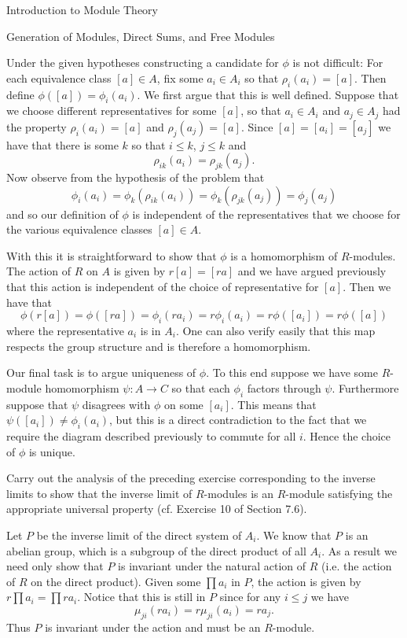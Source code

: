 \begin{chapter}{Introduction to Module Theory}
\begin{section}{Generation of Modules, Direct Sums, and Free Modules}
\begin{solution}
Under the given hypotheses constructing a candidate for $\phi$ is not difficult: For each equivalence class $[a]\in A$, fix some $a_i \in A_i$ so that $\rho_i(a_i) = [a]$. Then define $\phi([a]) = \phi_i(a_i)$. We first argue that this is well defined. Suppose that we choose different representatives for some $[a]$, so that $a_i\in A_i$ and $a_j\in A_j$ had the property $\rho_i(a_i) = [a]$ and $\rho_j(a_j) = [a]$. Since $[a] = [a_i] = [a_j]$ we have that there is some $k$ so that $i\le k$, $j\le k$  and \[
\rho_{ik}(a_i) = \rho_{jk}(a_j).
\]
Now observe from the hypothesis of the problem that \[
\phi_i(a_i) =  \phi_k(\rho_{ik}(a_i)) = \phi_k(\rho_{jk}(a_j))  = \phi_j(a_j)
\]
and so our definition of $\phi$ is independent of the representatives that we choose for the various equivalence classes $[a]\in A$.

With this it is straightforward to show that $\phi$ is a homomorphism of $R$-modules. The action of $R$ on $A$ is given by $r[a] = [ra]$ and we have argued previously that this action is independent of the choice of representative for $[a]$. Then we have that \[
\phi(r[a]) = \phi([ra]) = \phi_i(ra_i) = r\phi_i(a_i) = r\phi([a_i]) = r\phi([a])
\]
where the representative $a_i$ is in $A_i$. One can also verify easily that this map respects the group structure and is therefore a homomorphism. 

Our final task is to argue uniqueness of $\phi$. To this end suppose we have some $R$-module homomorphism $\psi: A\to C$ so that each $\phi_i$ factors through $\psi$. Furthermore suppose that $\psi$ disagrees with $\phi$ on some $[a_i]$. This means that $\psi([a_i]) \neq \phi_i(a_i)$, but this is a direct contradiction to the fact that we require the diagram described previously to commute for all $i$. Hence the choice of $\phi$ is unique. 


\end{solution}\oneperpage



\begin{problem}\label{ex:10.3.26}
Carry out the analysis of the preceding exercise corresponding to the inverse limits to show that the inverse limit of $R$-modules is an $R$-module satisfying the appropriate universal property (cf. Exercise 10 of Section 7.6).
\end{problem}
\begin{solution}
Let $P$ be the inverse limit of the direct system of $A_i$. We know that $P$ is an abelian group, which is a subgroup of the direct product of all $A_i$.  As a result we need only show that $P$ is invariant under the natural action of $R$ (i.e. the action of $R$ on the direct product). Given some $\prod a_i$ in $P$, the action is given by $r\prod a_i = \prod ra_i$. Notice that this is still in $P$ since for any $i\le j$ we have \[
\mu_{ji}(ra_i) = r\mu_{ji}(a_i) = ra_j.
\]
Thus $P$ is invariant under the action and must be an $R$-module. 


\end{solution}
\end{section}
\end{chapter}
